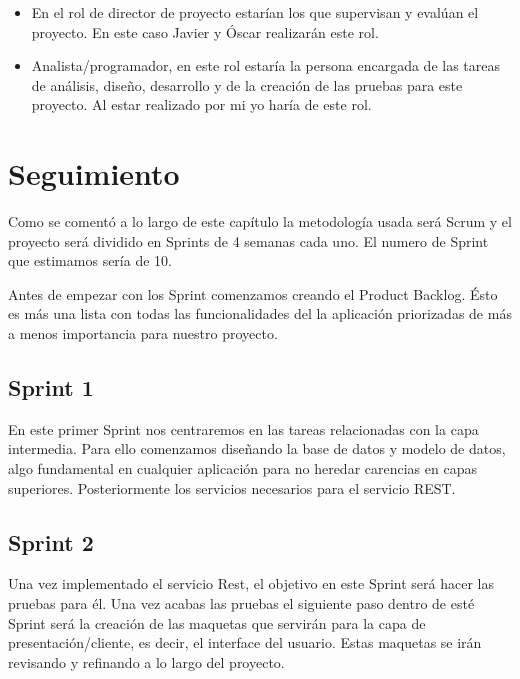 \begin{itemize}
\item En el rol de director de proyecto estarían los que 
supervisan y evalúan el proyecto. En este caso Javier y Óscar realizarán este rol.

\item Analista/programador, en este rol estaría la persona encargada de las tareas de análisis, diseño, desarrollo y de la creación de las pruebas para este proyecto. Al estar realizado por mi yo haría de este rol.





\end{itemize}
\section{Seguimiento}

Como se comentó a lo largo de este capítulo la metodología usada será  Scrum y el proyecto será dividido en Sprints de 4 semanas cada uno. El numero de Sprint que estimamos sería de 10.




 Antes de empezar con los Sprint comenzamos creando el Product Backlog. Ésto es más una lista con todas las funcionalidades del la aplicación priorizadas de más a menos importancia para nuestro proyecto. 

\subsection{Sprint 1}

En este primer Sprint nos centraremos en las tareas relacionadas con la capa intermedia. Para ello comenzamos diseñando la base de datos y modelo de datos, algo fundamental en cualquier aplicación para no heredar carencias en capas superiores. Posteriormente los servicios necesarios para el servicio REST.


\subsection{Sprint 2}
 Una vez implementado el servicio Rest, el objetivo en este Sprint será hacer las pruebas para él.
 Una vez acabas las pruebas el siguiente paso dentro de esté Sprint será la creación de las maquetas que servirán para la capa de presentación/cliente, es decir, el interface del usuario. Estas maquetas se irán revisando y refinando a lo largo del proyecto.
 
